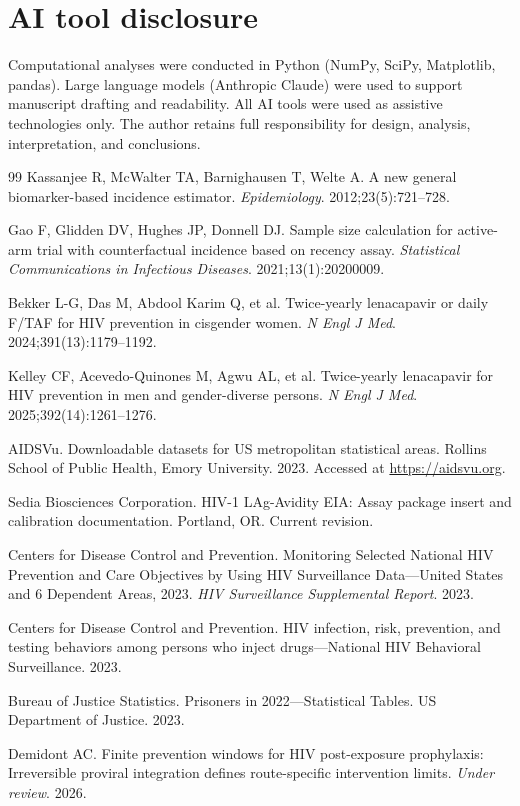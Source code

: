 \documentclass[11pt]{article}
\begin{document}
\section*{AI tool disclosure}
Computational analyses were conducted in Python (NumPy, SciPy, Matplotlib, pandas). Large language models (Anthropic Claude) were used to support manuscript drafting and readability. All AI tools were used as assistive technologies only. The author retains full responsibility for design, analysis, interpretation, and conclusions.

\begin{thebibliography}{99}
\small
{} Kassanjee R, McWalter TA, Barnighausen T, Welte A. A new general biomarker-based incidence estimator. \emph{Epidemiology}. 2012;23(5):721--728.

 Gao F, Glidden DV, Hughes JP, Donnell DJ. Sample size calculation for active-arm trial with counterfactual incidence based on recency assay. \emph{Statistical Communications in Infectious Diseases}. 2021;13(1):20200009.

 Bekker L-G, Das M, Abdool Karim Q, et al. Twice-yearly lenacapavir or daily F/TAF for HIV prevention in cisgender women. \emph{N Engl J Med}. 2024;391(13):1179--1192.

 Kelley CF, Acevedo-Quinones M, Agwu AL, et al. Twice-yearly lenacapavir for HIV prevention in men and gender-diverse persons. \emph{N Engl J Med}. 2025;392(14):1261--1276.

 AIDSVu. Downloadable datasets for US metropolitan statistical areas. Rollins School of Public Health, Emory University. 2023. Accessed at \url{https://aidsvu.org}.

 Sedia Biosciences Corporation. HIV-1 LAg-Avidity EIA: Assay package insert and calibration documentation. Portland, OR. Current revision.

 Centers for Disease Control and Prevention. Monitoring Selected National HIV Prevention and Care Objectives by Using HIV Surveillance Data---United States and 6 Dependent Areas, 2023. \emph{HIV Surveillance Supplemental Report}. 2023.

 Centers for Disease Control and Prevention. HIV infection, risk, prevention, and testing behaviors among persons who inject drugs---National HIV Behavioral Surveillance. 2023.

 Bureau of Justice Statistics. Prisoners in 2022---Statistical Tables. US Department of Justice. 2023.

 Demidont AC. Finite prevention windows for HIV post-exposure prophylaxis: Irreversible proviral integration defines route-specific intervention limits. \emph{Under review}. 2026.
\end{thebibliography}
\end{document}
